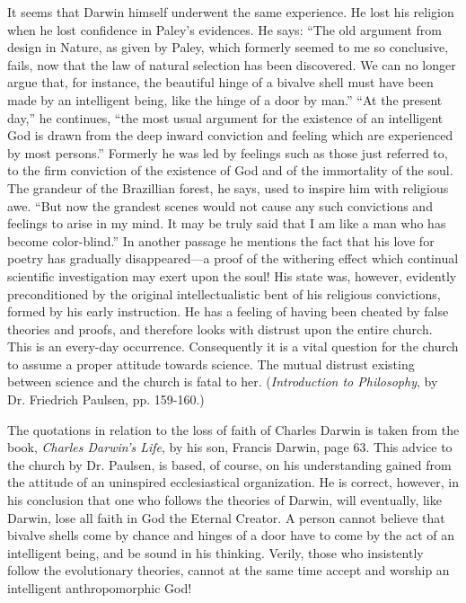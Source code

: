 It seems that Darwin himself underwent the same experience. He lost his religion when he
lost confidence in Paley's evidences. He says: ``The old argument from design in Nature, as
given by Paley, which formerly seemed to me so conclusive, fails, now that the law of
natural selection has been discovered. We can no longer argue that, for instance, the beautiful
hinge of a bivalve shell must have been made by an intelligent being, like the hinge of a door
by man.'' ``At the present day,'' he continues, ``the most usual argument for the existence of an
intelligent God is drawn from the deep inward conviction and feeling which are experienced
by most persons.'' Formerly he was led by feelings such as those just referred to, to the firm
conviction of the existence of God and of the immortality of the soul. The grandeur of the
Brazillian forest, he says, used to inspire him with religious awe. ``But now the grandest
scenes would not cause any such convictions and feelings to arise in my mind. It may be
truly said that I am like a man who has become color-blind.'' In another passage he mentions
the fact that his love for poetry has gradually disappeared—a proof of the withering effect
which continual scientific investigation may exert upon the soul! His state was, however,
evidently preconditioned by the original intellectualistic bent of his religious convictions,
formed by his early instruction. He has a feeling of having been cheated by false theories and
proofs, and therefore looks with distrust upon the entire church. This is an every-day
occurrence. Consequently it is a vital question for the church to assume a proper attitude
towards science. The mutual distrust existing between science and the church is fatal to her.
(\textit{Introduction to Philosophy}, by Dr. Friedrich Paulsen, pp. 159-160.)

The quotations in relation to the loss of faith of Charles Darwin is taken from the book,
\textit{Charles Darwin's Life}, by his son, Francis Darwin, page 63. This advice to the church by Dr.
Paulsen, is based, of course, on his understanding gained from the attitude of an uninspired
ecclesiastical organization. He is correct, however, in his conclusion that one who follows the
theories of Darwin, will eventually, like Darwin, lose all faith in God the Eternal Creator. A
person cannot believe that bivalve shells come by chance and hinges of a door have to come
by the act of an intelligent being, and be sound in his thinking. Verily, those who insistently
follow the evolutionary theories, cannot at the same time accept and worship an intelligent
anthropomorphic God!

